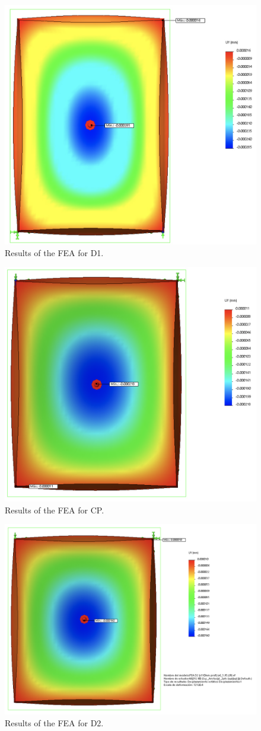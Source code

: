 \documentclass{report}
\begin{document}
\begin{figure}
\centering
\includegraphics[width=0.7\linewidth]{figures/FEAD1.png}
\caption{Results of the FEA for D1.}
\label{figure:FEAD1}
\end{figure}

\begin{figure}
\centering
\includegraphics[width=0.7\linewidth]{figures/FEACP.png}
\caption{Results of the FEA for CP.}
\label{figure:FEACP}
\end{figure}

\clearpage

\begin{figure}
\centering
\includegraphics[width=0.7\linewidth]{figures/FEAD2.png}
\caption{Results of the FEA for D2.}
\label{figure:FEAD2}
\end{figure}
\end{document}
